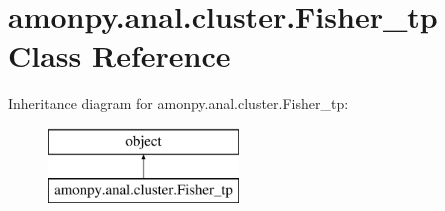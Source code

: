 \hypertarget{classamonpy_1_1anal_1_1cluster_1_1_fisher__tp}{\section{amonpy.\-anal.\-cluster.\-Fisher\-\_\-tp Class Reference}
\label{classamonpy_1_1anal_1_1cluster_1_1_fisher__tp}
}
Inheritance diagram for amonpy.\-anal.\-cluster.\-Fisher\-\_\-tp\-:\begin{figure}[H]
\begin{center}
\leavevmode
\includegraphics[height=2.000000cm]{classamonpy_1_1anal_1_1cluster_1_1_fisher__tp}
\end{center}
\end{figure}
